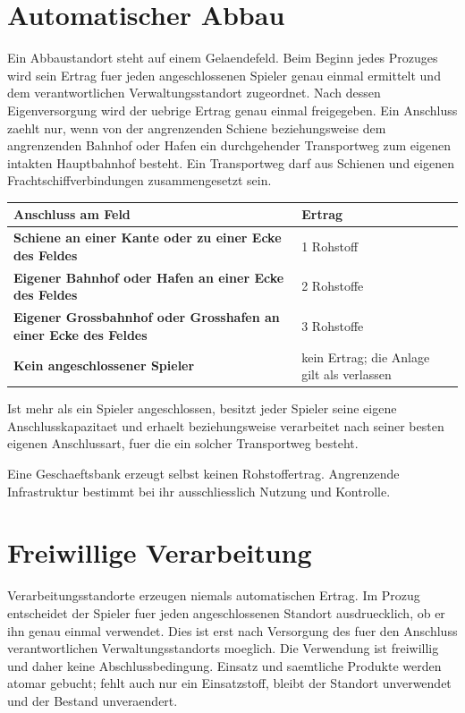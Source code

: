 \documentclass[11pt,a4paper,oneside,parskip=half]{scrreprt}
\begin{document}
\section{Automatischer Abbau}
Ein Abbaustandort steht auf einem Gelaendefeld. Beim Beginn jedes Prozuges wird
sein Ertrag fuer jeden angeschlossenen Spieler genau einmal ermittelt und dem
verantwortlichen Verwaltungsstandort zugeordnet. Nach dessen Eigenversorgung
wird der uebrige Ertrag genau einmal freigegeben. Ein Anschluss
zaehlt nur, wenn von der angrenzenden Schiene beziehungsweise dem angrenzenden
Bahnhof oder Hafen ein durchgehender Transportweg zum eigenen intakten
Hauptbahnhof besteht. Ein Transportweg darf aus Schienen und eigenen
Frachtschiffverbindungen zusammengesetzt sein.

\begin{center}
\begin{tabularx}{\textwidth}{>{\bfseries}p{}X}
\toprule
Anschluss am Feld & Ertrag \\
\midrule
Schiene an einer Kante oder zu einer Ecke des Feldes & 1 Rohstoff \\
Eigener Bahnhof oder Hafen an einer Ecke des Feldes & 2 Rohstoffe \\
Eigener Grossbahnhof oder Grosshafen an einer Ecke des Feldes & 3 Rohstoffe \\
Kein angeschlossener Spieler & kein Ertrag; die Anlage gilt als verlassen \\
\bottomrule
\end{tabularx}
\end{center}

Ist mehr als ein Spieler angeschlossen, besitzt jeder Spieler seine eigene Anschlusskapazitaet und erhaelt beziehungsweise verarbeitet nach seiner besten eigenen Anschlussart, fuer die ein solcher Transportweg besteht.

Eine Geschaeftsbank erzeugt selbst keinen Rohstoffertrag. Angrenzende Infrastruktur
bestimmt bei ihr ausschliesslich Nutzung und Kontrolle.

\section{Freiwillige Verarbeitung}
Verarbeitungsstandorte erzeugen niemals automatischen Ertrag. Im Prozug entscheidet der Spieler fuer jeden angeschlossenen Standort ausdruecklich, ob er ihn genau einmal verwendet. Dies ist erst nach Versorgung des fuer den Anschluss verantwortlichen Verwaltungsstandorts moeglich. Die Verwendung ist freiwillig und daher keine Abschlussbedingung. Einsatz und saemtliche Produkte werden atomar gebucht; fehlt auch nur ein Einsatzstoff, bleibt der Standort unverwendet und der Bestand unveraendert.
\end{document}
